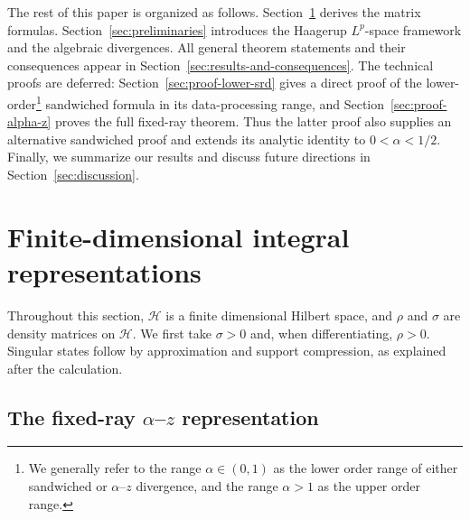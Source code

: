 \documentclass[12pt]{article}
\numberwithin{equation}{section}
\theoremstyle{definition}
\theoremstyle{remark}
\newcommand{\?}{\overset{?}{=}}
\newcommand{\cH}{\mathcal{H}}
\begin{document}
The rest of this paper is organized as follows.  Section~\ref{sec:finite-dimensional}
derives the matrix formulas.  Section~\ref{sec:preliminaries} introduces
the Haagerup $L^p$-space framework and the algebraic divergences.  All general theorem
statements and their consequences appear in
Section~\ref{sec:results-and-consequences}.  The technical proofs are deferred: Section~\ref{sec:proof-lower-srd} gives a direct proof of
the lower-order\footnote{We generally refer to the range $\alpha\in(0,1)$ as the lower order range of either sandwiched or $\alpha$--$z$ divergence, and the range $\alpha>1$ as the upper order range.} sandwiched formula in its data-processing range, and
Section~\ref{sec:proof-alpha-z} proves the full fixed-ray theorem.  Thus the
latter proof also supplies an alternative sandwiched proof and extends its
analytic identity to $0<\alpha<1/2$. Finally, we summarize our results and discuss future directions in Section~\ref{sec:discussion}.

\section{Finite-dimensional integral representations}
\label{sec:finite-dimensional}

Throughout this section, $\cH$ is a finite dimensional Hilbert space, and $\rho$ and
$\sigma$ are density matrices on $\cH$.  We first take $\sigma>0$ and,
when differentiating, $\rho>0$.  Singular states follow by approximation
and support compression, as explained after the calculation.

\subsection{The fixed-ray \texorpdfstring{$\alpha$--$z$}{alpha-z}
representation}
\end{document}

